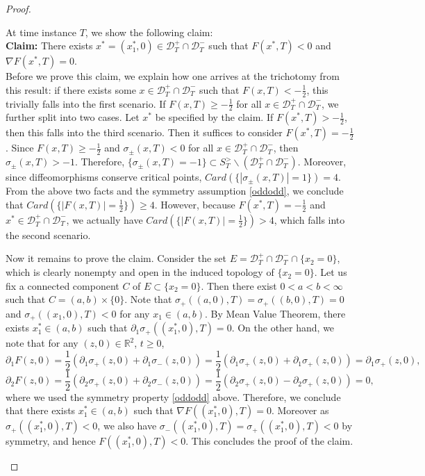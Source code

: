 \documentclass[11pt,reqno]{amsproc}
\newcommand{\R}{\mathbb{R}}
\newcommand{\p}{\partial}
\newcommand{\calD}{\mathcal{D}}
\begin{document}
\begin{proof}
\begin{enumerate}
        At time instance $T$, we show the following claim:\\
        
        \noindent\textbf{Claim:} There exists $x^* =(x_1^*,0) \in \calD_T^+ \cap \calD_T^-$ such that $F(x^*,T) < 0$ and $\nabla F(x^*,T) = 0$.\\
        
        Before we prove this claim, we explain how one arrives at the trichotomy from this result: if there exists some $x \in \calD_T^+ \cap \calD_T^-$ such that $F(x,T) < -\frac12$, this trivially falls into the first scenario. If $F(x,T) \ge -\frac12$ for all $x \in \calD_T^+ \cap \calD_T^-$, we further split into two cases. Let $x^*$ be specified by the claim. If $F(x^*,T) > -\frac12$, then this falls into the third scenario. Then it suffices to consider $F(x^*,T) = -\frac12$. Since $F(x,T) \ge -\frac12$ and $\sigma_\pm(x,T) < 0$ for all $x \in \calD_T^+ \cap \calD_T^-$, then $\sigma_\pm(x,T) > -1$. Therefore, $\{\sigma_\pm(x,T) = -1\} \subset S_T^>\backslash(\calD_T^+ \cap \calD_T^-)$. Moreover, since diffeomorphisms conserve critical points, $Card(\{|\sigma_\pm(x,T)| = 1\}) = 4$. From the above two facts and the symmetry assumption \eqref{oddodd}, we conclude that $Card(\{|F(x,T)| = \frac12\}) \ge 4$. However, because $F(x^*, T) = -\frac12$ and $x^* \in \calD_T^+ \cap \calD_T^-$, we actually have $Card(\{|F(x,T)| = \frac12\}) > 4$, which falls into the second scenario.

        Now it remains to prove the claim. Consider the set $E = \calD_T^+ \cap \calD_T^- \cap \{x_2 = 0\}$, which is clearly nonempty and open in the induced topology of $\{x_2 = 0\}$. Let us fix a connected component $C$ of $E \subset \{x_2 = 0\}$. Then there exist $0 < a < b < \infty$ such that $C = (a,b) \times \{0\}$. Note that $\sigma_+((a,0),T) = \sigma_+((b,0),T) = 0$ and $\sigma_+((x_1,0),T) < 0$ for any $x_1 \in (a,b)$. By Mean Value Theorem, there exists $x_1^* \in (a,b)$ such that $\p_1 \sigma_+((x_1^*,0),T) = 0.$ On the other hand, we note that for any $(z,0) \in \R^2$, $t \ge 0$,
        $$
        \p_1 F(z,0) = \frac12(\p_1\sigma_+(z,0) + \p_1\sigma_-(z,0)) = \frac12(\p_1\sigma_+(z,0) + \p_1\sigma_+(z,0)) = \p_1\sigma_+(z,0),
        $$
        $$
        \p_2 F(z,0) = \frac12(\p_2\sigma_+(z,0) + \p_2\sigma_-(z,0)) = \frac12(\p_2\sigma_+(z,0) - \p_2\sigma_+(z,0)) = 0,
        $$
        where we used the symmetry property \eqref{oddodd} above. Therefore, we conclude that there exists $x_1^* \in (a,b)$ such that $\nabla F((x_1^*,0),T) = 0$. Moreover as $\sigma_+((x_1^*,0), T) < 0$, we also have $\sigma_-((x_1^*,0), T) =\sigma_+((x_1^*,0), T) < 0$ by symmetry, and hence $F((x_1^*,0), T) < 0$. This concludes the proof of the claim.
    \end{enumerate}
\end{proof}
\end{document}
